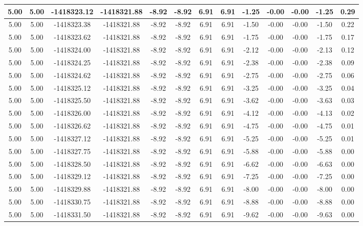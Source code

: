 \begin{table}[htbp]
\begin{adjustbox}{angle=90}
\begin{tabular}{|c|c|c|c|c|c|c|c|c|c|c|c|c|}
 5.00 & 5.00 & -1418323.12 & -1418321.88 & -8.92 & -8.92 & 6.91 & 6.91 & -1.25 & -0.00 & -0.00 & -1.25 & 0.29\\ \hline
 5.00 & 5.00 & -1418323.38 & -1418321.88 & -8.92 & -8.92 & 6.91 & 6.91 & -1.50 & -0.00 & -0.00 & -1.50 & 0.22\\ \hline
 5.00 & 5.00 & -1418323.62 & -1418321.88 & -8.92 & -8.92 & 6.91 & 6.91 & -1.75 & -0.00 & -0.00 & -1.75 & 0.17\\ \hline
 5.00 & 5.00 & -1418324.00 & -1418321.88 & -8.92 & -8.92 & 6.91 & 6.91 & -2.12 & -0.00 & -0.00 & -2.13 & 0.12\\ \hline
 5.00 & 5.00 & -1418324.25 & -1418321.88 & -8.92 & -8.92 & 6.91 & 6.91 & -2.38 & -0.00 & -0.00 & -2.38 & 0.09\\ \hline
 5.00 & 5.00 & -1418324.62 & -1418321.88 & -8.92 & -8.92 & 6.91 & 6.91 & -2.75 & -0.00 & -0.00 & -2.75 & 0.06\\ \hline
 5.00 & 5.00 & -1418325.12 & -1418321.88 & -8.92 & -8.92 & 6.91 & 6.91 & -3.25 & -0.00 & -0.00 & -3.25 & 0.04\\ \hline
 5.00 & 5.00 & -1418325.50 & -1418321.88 & -8.92 & -8.92 & 6.91 & 6.91 & -3.62 & -0.00 & -0.00 & -3.63 & 0.03\\ \hline
 5.00 & 5.00 & -1418326.00 & -1418321.88 & -8.92 & -8.92 & 6.91 & 6.91 & -4.12 & -0.00 & -0.00 & -4.13 & 0.02\\ \hline
 5.00 & 5.00 & -1418326.62 & -1418321.88 & -8.92 & -8.92 & 6.91 & 6.91 & -4.75 & -0.00 & -0.00 & -4.75 & 0.01\\ \hline
 5.00 & 5.00 & -1418327.12 & -1418321.88 & -8.92 & -8.92 & 6.91 & 6.91 & -5.25 & -0.00 & -0.00 & -5.25 & 0.01\\ \hline
 5.00 & 5.00 & -1418327.75 & -1418321.88 & -8.92 & -8.92 & 6.91 & 6.91 & -5.88 & -0.00 & -0.00 & -5.88 & 0.00\\ \hline
 5.00 & 5.00 & -1418328.50 & -1418321.88 & -8.92 & -8.92 & 6.91 & 6.91 & -6.62 & -0.00 & -0.00 & -6.63 & 0.00\\ \hline
 5.00 & 5.00 & -1418329.12 & -1418321.88 & -8.92 & -8.92 & 6.91 & 6.91 & -7.25 & -0.00 & -0.00 & -7.25 & 0.00\\ \hline
 5.00 & 5.00 & -1418329.88 & -1418321.88 & -8.92 & -8.92 & 6.91 & 6.91 & -8.00 & -0.00 & -0.00 & -8.00 & 0.00\\ \hline
 5.00 & 5.00 & -1418330.75 & -1418321.88 & -8.92 & -8.92 & 6.91 & 6.91 & -8.88 & -0.00 & -0.00 & -8.88 & 0.00\\ \hline
 5.00 & 5.00 & -1418331.50 & -1418321.88 & -8.92 & -8.92 & 6.91 & 6.91 & -9.62 & -0.00 & -0.00 & -9.63 & 0.00\\ \hline

\end{tabular}
\end{adjustbox}
\end{table}
